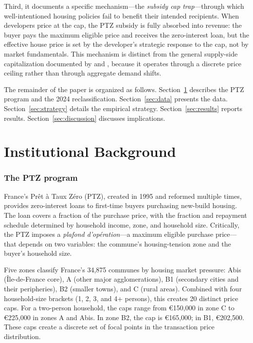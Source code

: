 \documentclass[12pt]{article}
\begin{document}
Third, it documents a specific mechanism---the \textit{subsidy cap trap}---through which well-intentioned housing policies fail to benefit their intended recipients. When developers price at the cap, the PTZ subsidy is fully absorbed into revenue: the buyer pays the maximum eligible price and receives the zero-interest loan, but the effective house price is set by the developer's strategic response to the cap, not by market fundamentals. This mechanism is distinct from the general supply-side capitalization documented by \citet{hilber2016impact} and \citet{diamond2019housing}, because it operates through a discrete price ceiling rather than through aggregate demand shifts.

The remainder of the paper is organized as follows. Section~\ref{sec:background} describes the PTZ program and the 2024 reclassification. Section~\ref{sec:data} presents the data. Section~\ref{sec:strategy} details the empirical strategy. Section~\ref{sec:results} reports results. Section~\ref{sec:discussion} discusses implications.

\section{Institutional Background}
\label{sec:background}

\subsubsection*{The PTZ program} France's Pr\^{e}t \`{a} Taux Z\'{e}ro (PTZ), created in 1995 and reformed multiple times, provides zero-interest loans to first-time buyers purchasing new-build housing. The loan covers a fraction of the purchase price, with the fraction and repayment schedule determined by household income, zone, and household size. Critically, the PTZ imposes a \textit{plafond d'op\'{e}ration}---a maximum eligible purchase price---that depends on two variables: the commune's housing-tension zone and the buyer's household size.

Five zones classify France's 34,875 communes by housing market pressure: Abis (\^{I}le-de-France core), A (other major agglomerations), B1 (secondary cities and their peripheries), B2 (smaller towns), and C (rural areas). Combined with four household-size brackets (1, 2, 3, and 4+ persons), this creates 20 distinct price caps. For a two-person household, the caps range from \euro150,000 in zone C to \euro225,000 in zones A and Abis. In zone B2, the cap is \euro165,000; in B1, \euro202,500. These caps create a discrete set of focal points in the transaction price distribution.
\end{document}
